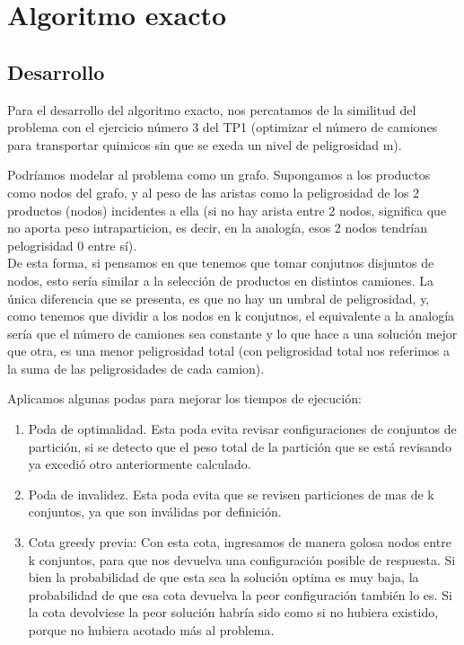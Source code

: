 \documentclass[10pt,a4paper]{article}
\begin{document}
\section{Algoritmo exacto}
\subsection{Desarrollo}
Para el desarrollo del algoritmo exacto, nos percatamos de la similitud del problema con el ejercicio número 3 del TP1 (optimizar el número de camiones para transportar quimicos sin que se exeda un nivel de peligrosidad m).

Podríamos modelar al problema como un grafo. 
Supongamos a los productos como nodos del grafo, y al peso de las aristas como la peligrosidad de los 2 productos (nodos) incidentes a ella (si no hay arista entre 2 nodos, significa que no aporta peso intraparticion, es decir, en la analogía, esos 2 nodos tendrían pelogrisidad 0 entre sí).\\
De esta forma, si pensamos en que tenemos que tomar conjutnos disjuntos de nodos, esto sería similar a la selección de productos en distintos camiones. La única diferencia que se presenta, es que no hay un umbral de peligrosidad, y, como tenemos que dividir a los nodos en k conjutnos, el equivalente a la analogía sería que el número de camiones sea constante y lo que hace a una solución mejor que otra, es una menor peligrosidad total (con peligrosidad total nos referimos a la suma de las peligrosidades de cada camion).

Aplicamos algunas podas para mejorar los tiempos de ejecución:
\begin{enumerate}
\item Poda de optimalidad. Esta poda evita revisar configuraciones de conjuntos de partición, si se detecto que el peso total de la partición que se está revisando ya excedió otro anteriormente calculado.
\item Poda de invalidez. Esta poda evita que se revisen particiones de mas de k conjuntos, ya que son inválidas por definición.
\item Cota greedy previa: Con esta cota, ingresamos de manera golosa nodos entre k conjuntos, para que nos devuelva una configuración posible de respuesta. Si bien la probabilidad de que esta sea la solución optima es muy baja, la probabilidad de que esa cota devuelva la peor configuración también lo es. Si la cota devolviese la peor solución habría sido como si no hubiera existido, porque no hubiera acotado más al problema.
\end{enumerate}
\end{document}
